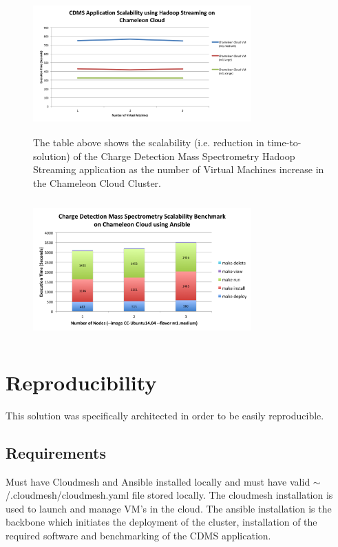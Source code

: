 \documentclass[9pt,twocolumn,twoside]{../../styles/osajnl}
\begin{document}
\begin{figure}
\centering
\includegraphics[height=2.1in, width=3.3in]{images/hadoop_benchmark}
\caption{The table above shows the scalability (i.e. reduction in
  time-to-solution) of the Charge Detection Mass Spectrometry Hadoop
  Streaming application as the number of Virtual Machines increase in
  the Chameleon Cloud Cluster.}
\label{fig:benchmark}
\end{figure}

\begin{figure}
\centering
\includegraphics[height=2.1in, width=3.3in]{images/benchmark}
\caption{}
\label{fig:benchmark}
\end{figure}

\section{Reproducibility} \label{reproducibility}
This solution was specifically architected in order to be easily
reproducible. 
\subsection{Requirements} \label{req}
Must have Cloudmesh and Ansible installed locally and must have valid
$\sim$/.cloudmesh/cloudmesh.yaml file stored locally. The cloudmesh
installation is used to launch and manage VM's in the cloud. The
ansible installation is the backbone which initiates the deployment of
the cluster, installation of the required software and benchmarking of
the CDMS application.
\end{document}
